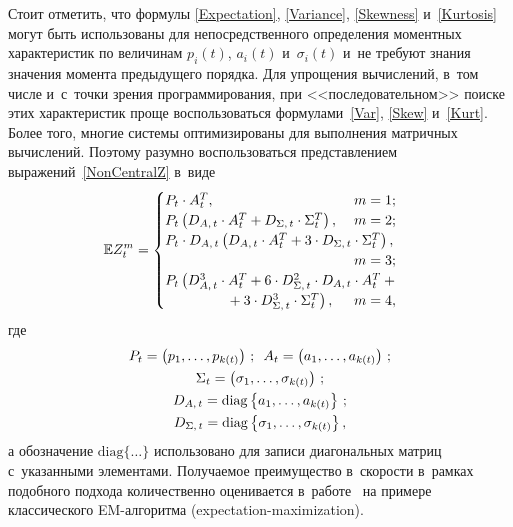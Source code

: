 \begin{multicols}{2}
Стоит отметить, что формулы \eqref{Expectation}, 
\eqref{Variance}, \eqref{Skewness} и~\eqref{Kurtosis} могут быть использованы 
для непосредственного определения моментных характеристик по величинам $p_i(t)$, 
$a_i(t)$ и~$\sigma_i(t)$ и~не требуют знания значения момента предыдущего порядка. 
Для упрощения вычислений, в~том числе и~с~точки зрения программирования, при 
<<последовательном>> поиске этих характеристик проще воспользоваться 
формулами~\eqref{Var}, \eqref{Skew} и~\eqref{Kurt}. Более того, многие 
системы оптимизированы для выполнения матричных вычислений. Поэтому разумно 
воспользоваться представлением выражений~\eqref{NonCentralZ} в~виде
\begin{equation*}
\mathbb{E} Z_t^m=\begin{cases}
P_t\cdot A_t^T, & \hspace*{-15mm}m=1;\\
P_t\left(D_{A,\,t}\cdot A_t^T + D_{\Sigma,\,t} \cdot \Sigma_t^T\right), & \hspace*{-15mm}m=2;\\
P_t\cdot D_{A,\,t}\left(D_{A,\,t}\cdot A_t^T+3\cdot D_{\Sigma,\,t}\cdot\Sigma_t^T\right),\\
 & \hspace*{-15mm}m=3;\\
P_t\left( D_{A,\,t}^3\cdot A_t^T +6\cdot D_{\Sigma,\,t}^2\cdot D_{A,\,t}\cdot A_t^T+{}\right.&\\
\hspace*{15mm}\left.{}+3\cdot D_{\Sigma,\,t}^3\cdot\Sigma_t^T\right), & \hspace*{-15mm}m=4,
\end{cases}
\end{equation*}
где
\begin{gather*}
P_t=\left(p_1,\ldots,p_{k(t)}\right)\,;\enskip
A_t=\left(a_1,\ldots,a_{k(t)}\right)\,;\\
\Sigma_t=\left(\sigma_1,\ldots,\sigma_{k(t)}\right)\,; \\
D_{A,\,t}=\mathrm{diag}\left\{a_1,\ldots,a_{k(t)}\right\}\,;\\
D_{\Sigma,\,t}=\mathrm{diag}\left\{\sigma_1,\ldots,\sigma_{k(t)}\right\},
\end{gather*}
а обозначение $\mathrm{diag}\{\ldots\}$ использовано для записи диагональных матриц 
с~указанными элементами. Получаемое преимущество в~скорости в~рамках подобного 
подхода количественно оценивается в~работе~\cite{Gorshenin2015a} на 
примере классического EM-ал\-го\-ритма  (expectation-maximization).


\end{multicols}
